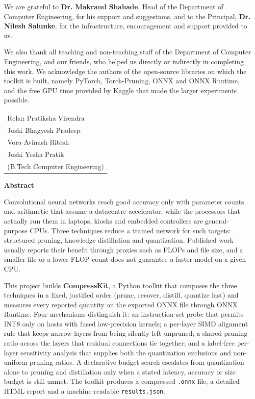 \documentclass[oneside,a4paper,12pt]{report}
\newcommand{\StudentA}{Relan Pratiksha Virendra}
\newcommand{\StudentB}{Joshi Bhagyesh Pradeep}
\newcommand{\StudentC}{Vora Avinash Ritesh}
\newcommand{\StudentD}{Joshi Yesha Pratik}
\newcommand{\Hod}{Dr. Makrand Shahade}
\newcommand{\Principal}{Dr. Nilesh Salunke}
\newcommand{\code}[1]{\texttt{\small #1}}
\begin{document}
We are grateful to \textbf{\Hod}, Head of the Department of Computer Engineering, for his support and suggestions, and to the Principal, \textbf{\Principal}, for the infrastructure, encouragement and support provided to us.

We also thank all teaching and non-teaching staff of the Department of Computer Engineering, and our friends, who helped us directly or indirectly in completing this work. We acknowledge the authors of the open-source libraries on which the toolkit is built, namely PyTorch, Torch-Pruning, ONNX and ONNX Runtime, and the free GPU time provided by Kaggle that made the larger experiments possible.

\vspace{1.6cm}
\hfill\begin{tabular}{@{}l@{}}
\StudentA\\ \StudentB\\ \StudentC\\ \StudentD\\ (B.Tech Computer Engineering)
\end{tabular}
\newpage

\begin{center}{\bfseries\Large Abstract}\end{center}
\vspace{0.4cm}
Convolutional neural networks reach good accuracy only with parameter counts and arithmetic that assume a datacentre accelerator, while the processors that actually run them in laptops, kiosks and embedded controllers are general-purpose CPUs. Three techniques reduce a trained network for such targets: structured pruning, knowledge distillation and quantization. Published work usually reports their benefit through proxies such as FLOPs and file size, and a smaller file or a lower FLOP count does not guarantee a faster model on a given CPU.

This project builds \textbf{CompressKit}, a Python toolkit that composes the three techniques in a fixed, justified order (prune, recover, distill, quantize last) and measures every reported quantity on the exported ONNX file through ONNX Runtime. Four mechanisms distinguish it: an instruction-set probe that permits INT8 only on hosts with fused low-precision kernels; a per-layer SIMD alignment rule that keeps narrow layers from being silently left unpruned; a shared pruning ratio across the layers that residual connections tie together; and a label-free per-layer sensitivity analysis that supplies both the quantization exclusions and non-uniform pruning ratios. A declarative budget search escalates from quantization alone to pruning and distillation only when a stated latency, accuracy or size budget is still unmet. The toolkit produces a compressed \code{.onnx} file, a detailed HTML report and a machine-readable \code{results.json}.
\end{document}
